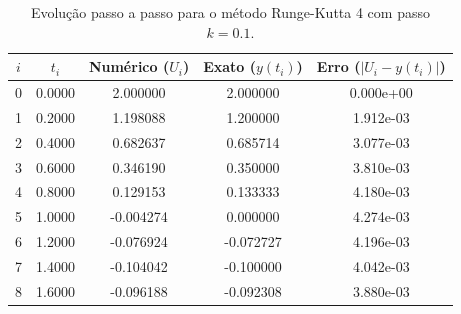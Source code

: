 \begin{table}[H]
    \centering
    \begin{tabular}{ccccc}
        \hline
        $i$ & $t_i$ & Numérico ($U_i$) & Exato ($y(t_i)$) & Erro ($|U_i - y(t_i)|$) \\
        \hline
        0 & 0.0000 & 2.000000 & 2.000000 & 0.000e+00 \\
        1 & 0.2000 & 1.198088 & 1.200000 & 1.912e-03 \\
        2 & 0.4000 & 0.682637 & 0.685714 & 3.077e-03 \\
        3 & 0.6000 & 0.346190 & 0.350000 & 3.810e-03 \\
        4 & 0.8000 & 0.129153 & 0.133333 & 4.180e-03 \\
        5 & 1.0000 & -0.004274 & 0.000000 & 4.274e-03 \\
        6 & 1.2000 & -0.076924 & -0.072727 & 4.196e-03 \\
        7 & 1.4000 & -0.104042 & -0.100000 & 4.042e-03 \\
        8 & 1.6000 & -0.096188 & -0.092308 & 3.880e-03 \\
        \hline
    \end{tabular}
    \caption{Evolução passo a passo para o método Runge-Kutta 4 com passo $k=0.1$.}
    \label{tab:trajetoria_runge-kutta_4_k01}
\end{table}
